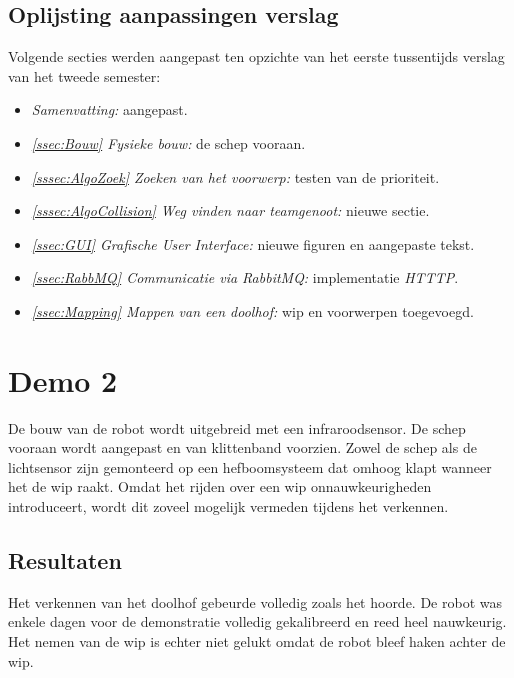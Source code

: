 \documentclass[eind]{penoverslag}
\begin{document}
\subsection{Oplijsting aanpassingen verslag}
\label{Assec:aanp1}
Volgende secties werden aangepast ten opzichte van het eerste tussentijds verslag van het tweede semester:

\begin{itemize}
\item \textit{Samenvatting:} aangepast.
\item \textit{\ref{ssec:Bouw} Fysieke bouw:} de schep vooraan.
\item \textit{\ref{sssec:AlgoZoek} Zoeken van het voorwerp:} testen van de prioriteit.
\item \textit{\ref{sssec:AlgoCollision} Weg vinden naar teamgenoot:} nieuwe sectie.
\item \textit{\ref{ssec:GUI} Grafische User Interface:} nieuwe figuren en aangepaste tekst.
\item \textit{\ref{ssec:RabbMQ} Communicatie via RabbitMQ:} implementatie \textit{HTTTP}.
\item \textit{\ref{ssec:Mapping} Mappen van een doolhof:} wip en voorwerpen toegevoegd.
\end{itemize}

\section{Demo 2}
\label{Asec:demo2}
De bouw van de robot wordt uitgebreid met een infraroodsensor. De schep vooraan wordt aangepast en van klittenband voorzien. Zowel de schep als de lichtsensor zijn gemonteerd op een hefboomsysteem dat omhoog klapt wanneer het de wip raakt. Omdat het rijden over een wip onnauwkeurigheden introduceert, wordt dit zoveel mogelijk vermeden tijdens het verkennen.

\subsection{Resultaten}
\label{Assec:result2}
Het verkennen van het doolhof gebeurde volledig zoals het hoorde. De robot was enkele dagen voor de demonstratie volledig gekalibreerd en reed heel nauwkeurig. Het nemen van de wip is echter niet gelukt omdat de robot bleef haken achter de wip.
\end{document}
